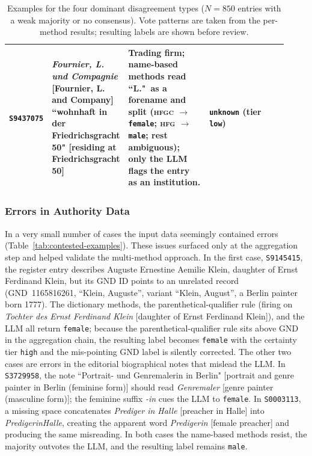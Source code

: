 \documentclass{eceasst}
\begin{document}
\begin{table}[h]
\begin{tabular}{p{0.10\linewidth} p{0.22\linewidth} p{0.30\linewidth} p{0.30\linewidth}}
    \addlinespace
    \texttt{S9437075} &
      \textit{Fournier, L. und Compagnie} [Fournier, L. and Company] \newline
      ``wohnhaft in der Friedrichsgracht 50" [residing at Friedrichsgracht 50] &
      Trading firm; name-based methods read ``L."~as a forename and split (\textsc{hfgc} $\rightarrow$ \texttt{female}; \textsc{hfg} $\rightarrow$ \texttt{male}; rest ambiguous); only the LLM flags the entry as an institution. &
      \texttt{unknown} (tier \texttt{low}) \\
    \bottomrule
  \end{tabular}
  \caption{Examples for the four dominant disagreement types ($N = 850$ entries with a weak majority or no consensus). Vote patterns are taken from the per-method results; resulting labels are shown before review.}
  \label{tab:disagreement-examples}
\end{table}

\subsubsection{Errors in Authority Data}\label{subsec:errors} In a very small number of cases the input data seemingly contained errors (Table~\ref{tab:contested-examples}). These issues surfaced only at the aggregation step and helped validate the multi-method approach. In the first case, \texttt{S9145415}, the register entry describes Auguste Ernestine Aemilie Klein, daughter of Ernst Ferdinand Klein, but its GND ID points to an unrelated record (GND~1165816261, ``Klein, Auguste'', variant ``Klein, August'', a Berlin painter born 1777). The dictionary methods, the parenthetical-qualifier rule (firing on \emph{Tochter des Ernst Ferdinand Klein} [daughter of Ernst Ferdinand Klein]), and the LLM all return \texttt{female}; because the parenthetical-qualifier rule sits above GND in the aggregation chain, the resulting label becomes \texttt{female} with the certainty tier \texttt{high} and the mis-pointing GND label is silently corrected. The other two cases are errors in the editorial biographical notes that mislead the LLM. In \texttt{S3729958}, the note ``Portrait- und Genremalerin in Berlin" [portrait and genre painter in Berlin (feminine form)] should read \emph{Genremaler} [genre painter (masculine form)]; the feminine suffix \emph{-in} cues the LLM to \texttt{female}. In \texttt{S0003113}, a missing space concatenates \emph{Prediger in Halle} [preacher in Halle] into \emph{PredigerinHalle}, creating the apparent word \emph{Predigerin} [female preacher] and producing the same misreading. In both cases the name-based methods resist, the majority outvotes the LLM, and the resulting label remains \texttt{male}.
\end{document}
